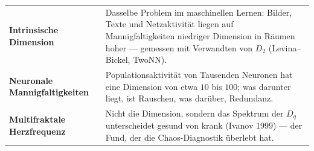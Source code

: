 \begin{forschung}
\begin{center}
{\small
\renewcommand{\arraystretch}{1.45}
\begin{tabular}{@{}P{3.0cm}P{5.2cm}@{}}
\toprule
\textbf{Intrinsische Dimension} & Dasselbe Problem im maschinellen Lernen: Bilder, Texte und Netzaktivität liegen auf Mannigfaltigkeiten niedriger Dimension in Räumen hoher --- gemessen mit Verwandten von $D_2$ (Levina--Bickel, TwoNN).\\
\textbf{Neuronale Mannigfaltigkeiten} & Populationsaktivität von Tausenden Neuronen hat eine Dimension von etwa $10$ bis $100$; was darunter liegt, ist Rauschen, was darüber, Redundanz.\\
\textbf{Multifraktale Herzfrequenz} & Nicht die Dimension, sondern das Spektrum der $D_q$ unterscheidet gesund von krank (Ivanov 1999) --- der Fund, der die Chaos-Diagnostik überlebt hat.\\
\bottomrule
\end{tabular}}
\end{center}

\begin{center}
\begin{minipage}{0.88\textwidth}
\end{minipage}
\end{center}
\end{forschung}

